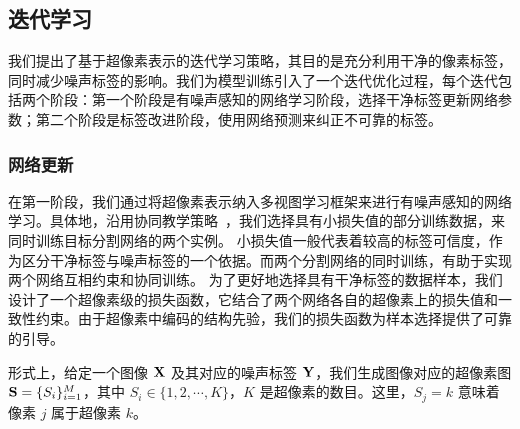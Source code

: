 \subsection{迭代学习} \label{sec:p2_2}
我们提出了基于超像素表示的迭代学习策略，其目的是充分利用干净的像素标签，同时减少噪声标签的影响。我们为模型训练引入了一个迭代优化过程，每个迭代包括两个阶段：第一个阶段是有噪声感知的网络学习阶段，选择干净标签更新网络参数；第二个阶段是标签改进阶段，使用网络预测来纠正不可靠的标签。

\subsubsection{网络更新}

在第一阶段，我们通过将超像素表示纳入多视图学习框架来进行有噪声感知的网络学习。具体地，沿用协同教学策略~\citep{ren2018learning, jiang2018mentornet, Han2018CoteachingRT}，我们选择具有小损失值\citep{arpit2017closer}的部分训练数据，来同时训练目标分割网络的两个实例。
小损失值一般代表着较高的标签可信度，作为区分干净标签与噪声标签的一个依据。而两个分割网络的同时训练，有助于实现两个网络互相约束和协同训练。
为了更好地选择具有干净标签的数据样本，我们设计了一个超像素级的损失函数，它结合了两个网络各自的超像素上的损失值和一致性约束\citep{Wei2020CombatingNL}。由于超像素中编码的结构先验，我们的损失函数为样本选择提供了可靠的引导。

形式上，给定一个图像 $\mathbf{X}$ 及其对应的噪声标签 $\mathbf{Y}$，我们生成图像对应的超像素图 $\mathbf{S} =\{S_i\}_{i=1}^M$，其中 $S_i\in\{1,2,\cdots, K\}$，$K$ 是超像素的数目。这里，$S_j=k$ 意味着像素 $j$ 属于超像素 $k$。

